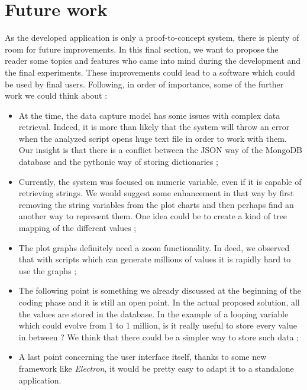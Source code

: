 \section{Future work}
As the developed application is only a proof-to-concept system, there is plenty of room for future improvements. In this final section, we want to propose the reader some topics and features who came into mind during the development and the final experiments. These improvements could lead to a software which could be used by final users. Following, in order of importance, some of the further work we could think about :
\begin{itemize}
  \item At the time, the data capture model has some issues with complex data retrieval. Indeed, it is more than likely that the system will throw an error when the analyzed script opens huge text file in order to work with them. Our insight is that there is a conflict between the JSON way of the MongoDB database and the pythonic way of storing dictionaries ;
  \item Currently, the system was focused on numeric variable, even if it is capable of retrieving strings. We would suggest some enhancement in that way by first removing the string variables from the plot charts and then perhaps find an another way to represent them. One idea could be to create a kind of tree mapping of the different values ;
  \item The plot graphs definitely need a zoom functionality. In deed, we observed that with scripts which can generate millions of values it is rapidly hard to use the graphs ; 
  \item The following point is something we already discussed at the beginning of the coding phase and it is still an open point. In the actual proposed solution, all the values are stored in the database. In the example of a looping variable which could evolve from 1 to 1 million, is it really useful to store every value in between ? We think that there could be a simpler way to store such data ;
  \item A last point concerning the user interface itself, thanks to some new framework like \textit{Electron}, it would be pretty easy to adapt it to a standalone application.
\end{itemize}
  
